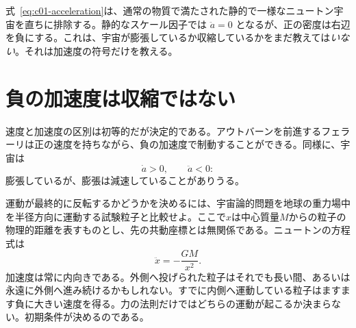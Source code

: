 \begin{classroomqa}
\end{classroomqa}

式~\eqref{eq:c01-acceleration}は、通常の物質で満たされた静的で一様なニュートン宇宙を直ちに排除する。静的なスケール因子では \(\ddot a=0\) となるが、正の密度は右辺を負にする。これは、宇宙が膨張しているか収縮しているかをまだ教えては\emph{いない}。それは加速度の符号だけを教える。

\section{負の加速度は収縮ではない}

速度と加速度の区別は初等的だが決定的である。アウトバーンを前進するフェラーリは正の速度を持ちながら、負の加速度で制動することができる。同様に、宇宙は
\begin{equation}
\dot a>0,
\qquad
\ddot a<0:
\end{equation}
膨張しているが、膨張は減速していることがありうる。

運動が最終的に反転するかどうかを決めるには、宇宙論的問題を地球の重力場中を半径方向に運動する試験粒子と比較せよ。ここで\(x\)は中心質量\(M\)からの粒子の物理的距離を表すものとし、先の共動座標とは無関係である。ニュートンの方程式は
\begin{equation}
\ddot x=-\frac{GM}{x^2}.
\label{eq:c01-particle-force}
\end{equation}
加速度は常に内向きである。外側へ投げられた粒子はそれでも長い間、あるいは永遠に外側へ進み続けるかもしれない。すでに内側へ運動している粒子はますます負に大きい速度を得る。力の法則だけではどちらの運動が起こるか決まらない。初期条件が決めるのである。

\begin{classroomqa}
\end{classroomqa}

